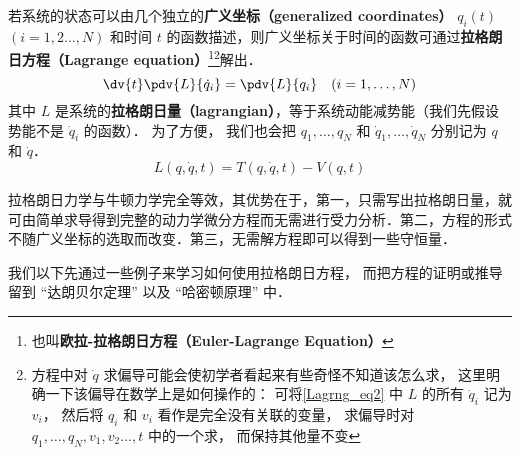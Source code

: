 

若系统的状态可以由几个独立的\textbf{广义坐标（generalized coordinates）} $q_i(t)$ $(i=1,2\dots,N)$ 和时间 $t$ 的函数描述，则广义坐标关于时间的函数可通过\textbf{拉格朗日方程（Lagrange equation）}\footnote{也叫\textbf{欧拉-拉格朗日方程（Euler-Lagrange Equation）}}\footnote{方程中对 $\dot q$ 求偏导可能会使初学者看起来有些奇怪不知道该怎么求， 这里明确一下该偏导在数学上是如何操作的： 可将\autoref{Lagrng_eq2} 中 $L$ 的所有 $\dot q_i$ 记为 $v_i$， 然后将 $q_i$ 和 $v_i$ 看作是完全没有关联的变量， 求偏导时对 $q_1,\dots, q_N, v_1, v_2\dots,t$ 中的一个求， 而保持其他量不变}解出．
\begin{equation}\label{Lagrng_eq1}
\dv{t} \pdv{L}{\dot q_i} = \pdv{L}{q_i}
\quad (i=1,\dots,N)
\end{equation}
其中 $L$ 是系统的\textbf{拉格朗日量（lagrangian）}，等于系统动能减势能（我们先假设势能不是 $\dot q_i$ 的函数）． 为了方便， 我们也会把 $q_1, \dots, q_N$ 和 $\dot q_1,\dots,\dot q_N$ 分别记为 $q$ 和 $\dot q$．
\begin{equation}\label{Lagrng_eq2}
L(q, \dot q, t) = T(q, \dot q, t) - V(q, t)
\end{equation}


拉格朗日力学与牛顿力学完全等效，其优势在于，第一，只需写出拉格朗日量，就可由简单求导得到完整的动力学微分方程而无需进行受力分析．第二，方程的形式不随广义坐标的选取而改变．第三，无需解方程即可以得到一些守恒量．

我们以下先通过一些例子来学习如何使用拉格朗日方程， 而把方程的证明或推导留到 “达朗贝尔定理” 以及 “哈密顿原理” 中．

